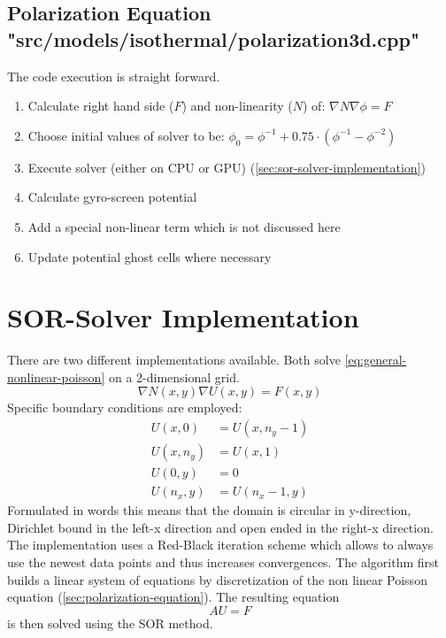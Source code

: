 \documentclass[master.tex]{subfiles}
\begin{document}
 \subsection{Polarization Equation {\small "src/models/isothermal/polarization3d.cpp"}}
\label{sec:components-polarization}
The code execution is straight forward.
\begin{enumerate}
    \item Calculate right hand side ($F$) and non-linearity ($N$) of: $\nabla N \nabla \phi = F$
    \item Choose initial values of solver to be: $\phi_0 = \phi^{-1} + 0.75 \cdot (\phi^{-1} - \phi^{-2})$
    \item Execute solver (either on CPU or GPU) (\autoref{sec:sor-solver-implementation})
    \item Calculate gyro-screen potential
    \item Add a special non-linear term which is not discussed here
    \item Update potential ghost cells where necessary
\end{enumerate}


\section{SOR-Solver Implementation}
\label{sec:sor-solver-implementation}
There are two different implementations available. Both solve \autoref{eq:general-nonlinear-poisson} on a 2-dimensional grid.
\begin{equation}
    \nabla N(x,y)\nabla U(x,y) = F(x,y)\label{eq:general-nonlinear-poisson}
\end{equation}
Specific boundary conditions are employed:
\begin{equation}
    \begin{split}
        U(x, 0) &= U(x, n_y - 1) \\
        U(x, n_y) &= U(x, 1)\\
        U(0, y) &= 0\\
        U(n_x, y) &= U(n_x - 1, y)
    \end{split}
\end{equation}
Formulated in words this means that the domain is circular in y-direction, Dirichlet bound in the left-x direction and open ended in the right-x direction.
The implementation uses a Red-Black iteration scheme which allows to always use the newest data points and thus increases convergences. The algorithm first builds a linear system of equations by discretization of the non linear Poisson equation (\autoref{sec:polarization-equation}). The resulting equation
\begin{equation*}
    AU = F
\end{equation*}
is then solved using the \ac{SOR} \cite{SORPaper} method.
\end{document}
